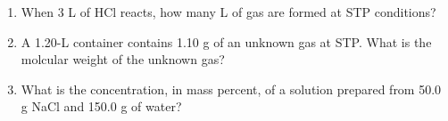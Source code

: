 \documentclass[main.tex]{subfiles}
\begin{document}
\begin{fullwidth}
\begin{multicols*}{2}
\begin{enumerate}
\item  When 3 L of HCl reacts, how many L of  gas are formed at STP conditions?
\begin{center}\end{center}
\begin{enumerate}[label=(\alph*)]\vspace{-0.5cm}
\end{enumerate}\vspace{-0.5cm}

\item  A 1.20-L container contains 1.10 g of an unknown gas at STP.  What is the molcular weight of the unknown gas?
\begin{enumerate}[label=(\alph*)]\vspace{-0.5cm}
\end{enumerate}\vspace{-0.5cm}
\item What is the concentration, in mass percent, of a solution prepared from 50.0 g NaCl and 150.0 g of water? 
\begin{enumerate}[label=(\alph*)]\vspace{-0.5cm}
\end{enumerate}\vspace{-0.5cm}



\end{enumerate}
\end{multicols*}
\end{fullwidth}
\end{document}
